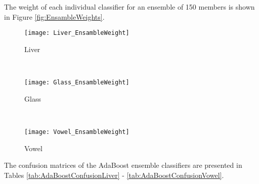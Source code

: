 The weight of each individual classifier for an ensemble of 150 members is shown in Figure \ref{fig:EnsambleWeights}.
\begin{figure*}[!ht]
	\centering
	\begin{subfigure}[b]{0.3\textwidth}
		\centering
		\texttt{[image: Liver\_EnsambleWeight]}
      \caption{Liver}
	\end{subfigure}%
	~
	\begin{subfigure}[b]{0.3\textwidth}
		\centering
		\texttt{[image: Glass\_EnsambleWeight]}
        \caption{Glass}
	\end{subfigure}	
    ~
	\begin{subfigure}[b]{0.3\textwidth}
		\centering
		\texttt{[image: Vowel\_EnsambleWeight]}
        \caption{Vowel}
	\end{subfigure}%
	\caption{Distribution of Ensemble Weights}
	\label{fig:EnsambleWeights}
\end{figure*}
The confusion matrices of the AdaBoost ensemble classifiers are presented in Tables \ref{tab:AdaBoostConfusionLiver} - \ref{tab:AdaBoostConfusionVowel}.  
\begin{table}[h!]
\caption{Confusion Matrix for AdaBoost Ensemble (Liver)}
\label{tab:AdaBoostConfusionLiver}
\centering

\end{table}
\begin{table}[h!]
\caption{Confusion Matrix for AdaBoost Ensemble (Glass)}
\label{tab:AdaBoostConfusionGlass}
\centering

\end{table}
\begin{table}[h!]
\caption{Confusion Matrix for AdaBoost Ensemble (Vowel)}
\label{tab:AdaBoostConfusionVowel}
\centering

\end{table}
